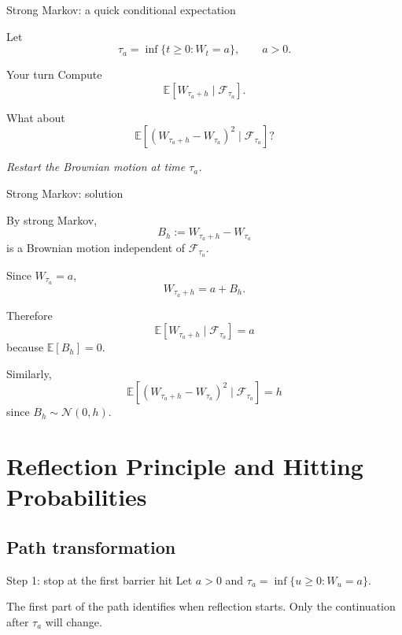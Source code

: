 \documentclass[handout,10pt,aspectratio=169]{beamer}
\newcommand{\E}{\mathbb E}
\newcommand{\F}{\mathcal F}
\begin{document}
\begin{frame}{Strong Markov: a quick conditional expectation}

Let
\[
\tau_a=\inf\{t\ge0:W_t=a\},
\qquad a>0.
\]

\begin{block}{Your turn}
Compute
\[
\E\left[W_{\tau_a+h}\mid\F_{\tau_a}\right].
\]

What about
\[
\E\left[(W_{\tau_a+h}-W_{\tau_a})^2
\mid\F_{\tau_a}\right]?
\]
\end{block}

\vfill

\centering
\textit{Restart the Brownian motion at time \(\tau_a\).}

\end{frame}


\begin{frame}{Strong Markov: solution}

By strong Markov,
\[
B_h:=W_{\tau_a+h}-W_{\tau_a}
\]
is a Brownian motion independent of \(\F_{\tau_a}\).

Since \(W_{\tau_a}=a\),
\[
W_{\tau_a+h}=a+B_h.
\]

Therefore
\[
\boxed{
\E[W_{\tau_a+h}\mid\F_{\tau_a}]=a
}
\]
because \(\E[B_h]=0\).

Similarly,
\[
\boxed{
\E[(W_{\tau_a+h}-W_{\tau_a})^2
\mid\F_{\tau_a}]=h
}
\]
since \(B_h\sim\mathcal N(0,h)\).

\end{frame}


\section{Reflection Principle and Hitting Probabilities}
\subsection{Path transformation}

\begin{frame}{Step 1: stop at the first barrier hit}
Let \(a>0\) and \(\tau_a=\inf\{u\ge0:W_u=a\}\).
\begin{center}
\end{center}
The first part of the path identifies when reflection starts. Only the continuation after \(\tau_a\) will change.
\end{frame}
\end{document}
